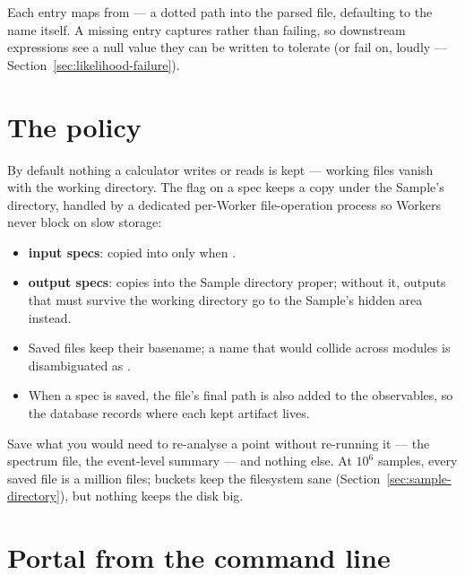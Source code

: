 Each  entry maps  from  --- a dotted
path into the parsed file, defaulting to the name itself. A missing entry captures
 rather than failing, so downstream expressions see a null value they can be
written to tolerate (or fail on, loudly --- Section~\ref{sec:likelihood-failure}).

\section{The  policy}
\label{sec:save-policy}

By default nothing a calculator writes or reads is kept --- working files vanish with
the working directory. The  flag on a spec keeps a copy under the Sample's
directory, handled by a dedicated per-Worker file-operation process so Workers never
block on slow storage:

\begin{itemize}
  \item \textbf{input specs}: copied into  only when
        .
  \item \textbf{output specs}:  copies into the Sample directory
        proper; without it, outputs that must survive the working directory go to the
        Sample's hidden  area instead.
  \item Saved files keep their basename; a name that would collide across modules is
        disambiguated as .
  \item When a spec is saved, the file's final path is also added to the observables,
        so the database records where each kept artifact lives.
\end{itemize}

\begin{jtip}
Save what you would need to re-analyse a point without re-running it --- the spectrum
file, the event-level summary --- and nothing else. At $10^6$ samples, every saved file
is a million files; buckets keep the filesystem sane
(Section~\ref{sec:sample-directory}), but nothing keeps the disk big.
\end{jtip}

\section{Portal from the command line}
\label{sec:portal-cli}


